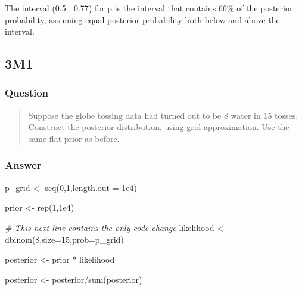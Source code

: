 \documentclass[
]{book}
\newenvironment{Shaded}{\begin{snugshade}}{\end{snugshade}}
\newcommand{\AttributeTok}[1]{\textcolor[rgb]{0.77,0.63,0.00}{#1}}
\newcommand{\CommentTok}[1]{\textcolor[rgb]{0.56,0.35,0.01}{\textit{#1}}}
\newcommand{\DecValTok}[1]{\textcolor[rgb]{0.00,0.00,0.81}{#1}}
\newcommand{\FloatTok}[1]{\textcolor[rgb]{0.00,0.00,0.81}{#1}}
\newcommand{\FunctionTok}[1]{\textcolor[rgb]{0.00,0.00,0.00}{#1}}
\newcommand{\NormalTok}[1]{#1}
\newcommand{\OtherTok}[1]{\textcolor[rgb]{0.56,0.35,0.01}{#1}}
\newcommand{\SpecialCharTok}[1]{\textcolor[rgb]{0.00,0.00,0.00}{#1}}
\begin{document}
The interval (0.5 , 0.77) for p is the interval that contains 66\% of the posterior probability, assuming equal posterior probability both below and above the interval.

\hypertarget{m1-1}{%
\subsection*{3M1}\label{m1-1}}

\hypertarget{question-22}{%
\subsubsection*{Question}\label{question-22}}

\begin{quote}
Suppose the globe tossing data had turned out to be 8 water in 15 tosses. Construct the posterior distribution, using grid approximation. Use the same flat prior as before.
\end{quote}

\hypertarget{answer-22}{%
\subsubsection*{Answer}\label{answer-22}}

\begin{Shaded}
\begin{Highlighting}[]
\NormalTok{p\_grid }\OtherTok{\textless{}{-}} \FunctionTok{seq}\NormalTok{(}\DecValTok{0}\NormalTok{,}\DecValTok{1}\NormalTok{,}\AttributeTok{length.out =} \FloatTok{1e4}\NormalTok{)}

\NormalTok{prior }\OtherTok{\textless{}{-}} \FunctionTok{rep}\NormalTok{(}\DecValTok{1}\NormalTok{,}\FloatTok{1e4}\NormalTok{)}

\CommentTok{\# This next line contains the only code change}
\NormalTok{likelihood }\OtherTok{\textless{}{-}} \FunctionTok{dbinom}\NormalTok{(}\DecValTok{8}\NormalTok{,}\AttributeTok{size=}\DecValTok{15}\NormalTok{,}\AttributeTok{prob=}\NormalTok{p\_grid)}

\NormalTok{posterior }\OtherTok{\textless{}{-}}\NormalTok{ prior }\SpecialCharTok{*}\NormalTok{ likelihood}

\NormalTok{posterior }\OtherTok{\textless{}{-}}\NormalTok{ posterior}\SpecialCharTok{/}\FunctionTok{sum}\NormalTok{(posterior)}
\end{Highlighting}
\end{Shaded}
\end{document}
